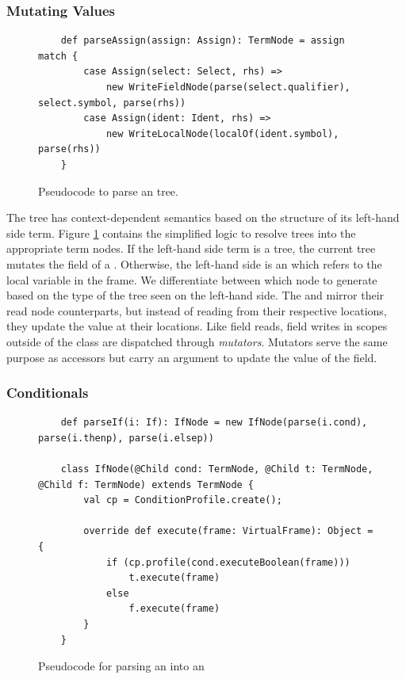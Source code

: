 \subsubsection*{Mutating Values}

\begin{figure}[!htb]
	\begin{verbatim}
	def parseAssign(assign: Assign): TermNode = assign match {
		case Assign(select: Select, rhs) => 
			new WriteFieldNode(parse(select.qualifier), select.symbol, parse(rhs)) 
		case Assign(ident: Ident, rhs) =>
			new WriteLocalNode(localOf(ident.symbol), parse(rhs)) 
	}
	\end{verbatim}
	\caption{Pseudocode to parse an  tree.}
	\label{impl:parse-assign}
\end{figure}

The  tree has context-dependent semantics based on the structure of its left-hand side term.
Figure \ref{impl:parse-assign} contains the simplified logic to resolve  trees into the appropriate term nodes.
If the left-hand side term is a  tree, the current tree mutates the field of a .
Otherwise, the left-hand side is an  which refers to the local variable in the frame.
We differentiate between which node to generate based on the type of the tree seen on the left-hand side.
The  and  mirror their read node counterparts, but instead of reading from their respective locations, they update the value at their locations.
Like field reads, field writes in scopes outside of the class are dispatched through \textit{mutators}.
Mutators serve the same purpose as accessors but carry an argument to update the value of the field.

\subsubsection*{Conditionals}

\begin{figure}[!htb]
	\begin{verbatim}
	def parseIf(i: If): IfNode = new IfNode(parse(i.cond), parse(i.thenp), parse(i.elsep))
		
	class IfNode(@Child cond: TermNode, @Child t: TermNode, @Child f: TermNode) extends TermNode {
		val cp = ConditionProfile.create();
			
		override def execute(frame: VirtualFrame): Object = {
			if (cp.profile(cond.executeBoolean(frame)))
				t.execute(frame)
			else 
				f.execute(frame)		
		}
	}
	\end{verbatim}
	\caption{Pseudocode for parsing an  into an }
	\label{impl:if}
\end{figure}

